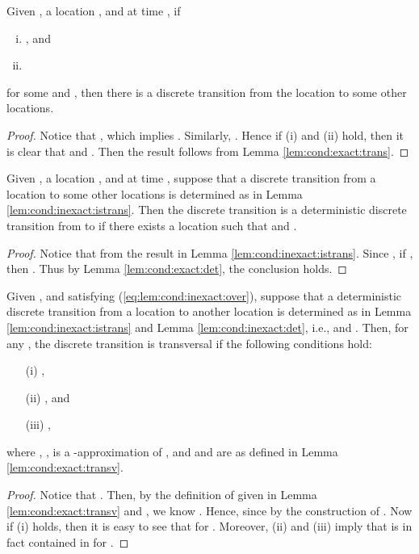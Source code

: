 \begin{lem} \label{lem:cond:inexact:istrans}
Given ,  a location , and  at time ,
if
\begin{enumerate}[(i)]
\item  , and
\item  
\end{enumerate} 
for some  and , then there is a discrete transition from the location  to some other locations.
\end{lem}
\begin{proof}
Notice that , which implies .
Similarly,  .
Hence if (i) and (ii) hold, then it is clear that  and .
Then the result follows from Lemma \ref{lem:cond:exact:trans}. 
\end{proof}


\begin{lem} \label{lem:cond:inexact:det}
Given , a location , and  at time , suppose that a discrete transition from a location  to some other locations is determined as in Lemma \ref{lem:cond:inexact:istrans}.
Then the discrete transition is a deterministic discrete transition from  to  if there exists a location  such that  and .
\end{lem}
\begin{proof}
Notice that  from the result in Lemma \ref{lem:cond:inexact:istrans}.
Since , if  , then  .
Thus by Lemma \ref{lem:cond:exact:det}, the conclusion holds.
\end{proof}




\begin{lem} \label{lem:cond:inexact:transv}
Given ,  and  satisfying (\ref{eq:lem:cond:inexact:over}), suppose that a deterministic discrete transition from a location  to another location  is determined as in Lemma \ref{lem:cond:inexact:istrans} and Lemma \ref{lem:cond:inexact:det}, i.e.,  and .
Then, for any , the discrete transition is transversal if the following conditions hold:
\begin{itemize}
\item[(i)] , 
 \item[(ii)] , and 
 \item[(iii)] ,
 \end{itemize}
where ,  ,  is a -approximation of , and  and  are as defined in Lemma \ref{lem:cond:exact:transv}. 
\end{lem}
\begin{proof}
Notice that .
Then, by the definition of  given in Lemma \ref{lem:cond:exact:transv} and , we know .
Hence,  since  by the construction of  .
Now if (i) holds, then it is easy to see that  for .
Moreover, (ii) and (iii) imply that  is in fact contained in  for .
\end{proof}





